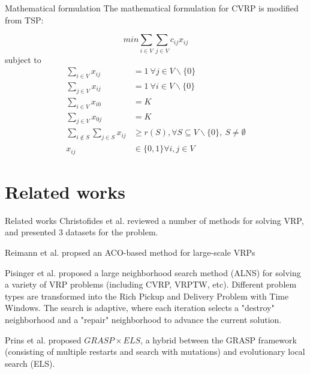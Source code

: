 \documentclass[9pt]{beamer}
\begin{document}
\begin{frame}{Mathematical formulation}
The mathematical formulation for CVRP is modified from TSP:

\begin{equation}
    min \sum_{i \in V} \sum_{j \in V} c_{ij}x_{ij}
\end{equation}
subject to
\begin{align}
    \sum_{i \in V} x_{ij} & = 1 \ \forall j \in V \backslash \{0\} \\
    \sum_{j \in V} x_{ij} & = 1 \ \forall i \in V \backslash \{0\} \\
    \sum_{i \in V} x_{i0} & = K \\
    \sum_{j \in V} x_{0j} & = K \\
    \sum_{i \notin S} \sum_{j \in S} x_{ij} & \geq r(S), \forall S \subseteq V \backslash \{0\},\ S \neq \emptyset\\
    x_{ij} & \in \{ 0, 1 \} \forall i,j \in V
\end{align}

\end{frame}

\section{Related works}
\begin{frame}{Related works}
Christofides et al. \cite{christofides1976vehicle} reviewed a number of methods for solving VRP, and presented 3 datasets for the problem.

Reimann et al. \cite{reimann2004d} propsed an ACO-based method for large-scale VRPs

Pisinger et al. \cite{pisinger2007general} proposed a large neighborhood search method (ALNS) for solving a variety of VRP problems (including CVRP, VRPTW, etc). Different problem types are transformed into the Rich Pickup and Delivery Problem with Time Windows. The search is adaptive, where each iteration selects a "destroy" neighborhood and a "repair" neighborhood to advance the current solution.

Prins et al. \cite{prins2009grasp} proposed $GRASP \times ELS$, a hybrid between the GRASP framework (consisting of multiple restarts and search with mutations) and evolutionary local search (ELS).
\end{frame}
\end{document}
